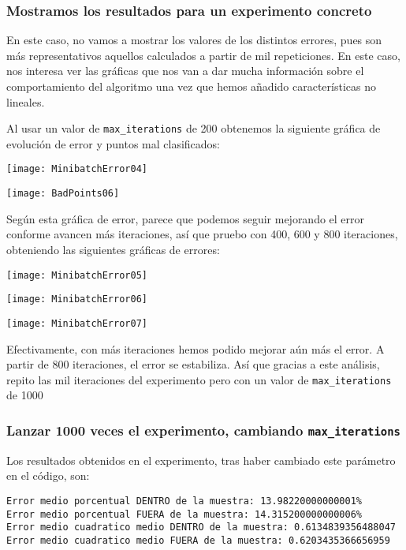 \documentclass[11pt]{article}
\begin{document}
\subsubsection{Mostramos los resultados para un experimento concreto}

En este caso, no vamos a mostrar los valores de los distintos errores, pues son más representativos aquellos calculados a partir de mil repeticiones. En este caso, nos interesa ver las gráficas que nos van a dar mucha información sobre el comportamiento del algoritmo una vez que hemos añadido características no lineales.

Al usar un valor de \lstinline{max_iterations} de 200 obtenemos la siguiente gráfica de evolución de error y puntos mal clasificados:

\texttt{[image: MinibatchError04]}

\texttt{[image: BadPoints06]}

Según esta gráfica de error, parece que podemos seguir mejorando el error conforme avancen más iteraciones, así que pruebo con 400, 600 y 800 iteraciones, obteniendo las siguientes gráficas de errores:


\texttt{[image: MinibatchError05]}

\texttt{[image: MinibatchError06]}

\texttt{[image: MinibatchError07]}

Efectivamente, con más iteraciones hemos podido mejorar aún más el error. A partir de 800 iteraciones, el error se estabiliza. Así que gracias a este análisis, repito las mil iteraciones del experimento pero con un valor de \lstinline{max_iterations} de 1000

\subsubsection{Lanzar 1000 veces el experimento, cambiando \lstinline{max_iterations}}

Los resultados obtenidos en el experimento, tras haber cambiado este parámetro en el código, son:

\begin{lstlisting}
Error medio porcentual DENTRO de la muestra: 13.98220000000001%
Error medio porcentual FUERA de la muestra: 14.315200000000006%
Error medio cuadratico medio DENTRO de la muestra: 0.6134839356488047
Error medio cuadratico medio FUERA de la muestra: 0.6203435366656959
\end{lstlisting}
\end{document}
